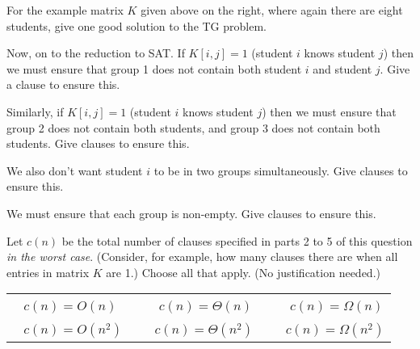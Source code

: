 \documentclass[11pt,fleqn]{exam}
\newcommand{\fillinMCmath}[1]{\begin{tikzpicture}\draw circle [radius=0.5em];\end{tikzpicture}\ #1}
\newif\ifsolutions\solutionsfalse
\begin{document}
\begin{questions}
\question[2]
  For the example matrix $K$ given above on the right, where again there are eight students, give one good solution to the TG problem.

      \ifsolutions
      
      \fi
  
\question[2]
Now, on to the reduction to SAT. If $K[i,j] = 1$ (student $i$ knows student $j$) then we must ensure that
group 1 does not contain both student $i$ and student $j$.
Give a clause to ensure this.

    \ifsolutions
    
    \fi
    
\question[2]
Similarly, if $K[i,j] = 1$ (student $i$ knows student $j$) then we must ensure
that group 2 does not contain both students, and group 3 does not contain both students.
Give clauses to ensure this.

    \ifsolutions
    
    \fi
    
\question[2]
We also don't want student $i$ to be in two groups simultaneously. Give clauses
to ensure this.

    \ifsolutions
    
    \fi

\question[2]
We must ensure that each group is non-empty. Give clauses to ensure this.

    \ifsolutions
    
    \fi
    
\question[2]
  Let $c(n)$ be the total number of clauses specified in parts 2 to 5 of this question {\em in the worst case}. (Consider, for example, how many clauses there are when all entries in matrix $K$ are 1.) Choose all that apply. (No justification needed.)

  \vspace{.1in}

    \ifsolutions
    
    \else
      \begin{tabular}{lllll}
        \hspace{.5in} \fillinMCmath{} $c(n) = O(n)$ & \hspace{.5in} & \fillinMCmath{} $c(n) = \Theta(n)$ & \hspace{.5in} & \fillinMCmath{} $c(n) = \Omega(n)$ \\

      \hspace{.5in} \fillinMCmath{} $c(n) = O(n^2)$ & \hspace{.5in} & \fillinMCmath{}$c(n) = \Theta(n^2)$ & \hspace{.5in} & \fillinMCmath{}$c(n) = \Omega(n^2)$
      \end{tabular}
\fi
  \vspace{.1in}


\end{questions}
\end{document}
